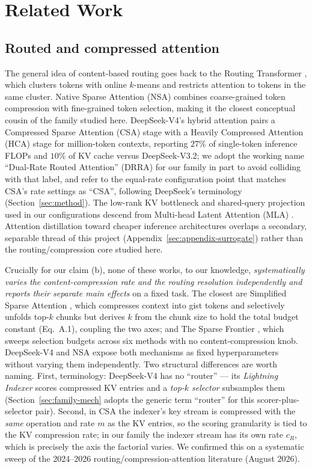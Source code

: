 \section{Related Work}
\label{sec:related}

\subsection{Routed and compressed attention}
The general idea of content-based routing goes back to the Routing
Transformer \citep{roy2020routing}, which clusters tokens with online
$k$-means and restricts attention to tokens in the same cluster. Native
Sparse Attention (NSA) \citep{yuan2025nsa} combines coarse-grained token
compression with fine-grained token selection, making it the closest
conceptual cousin of the family studied here. DeepSeek-V4's hybrid
attention \citep{deepseekv4_2026} pairs a Compressed Sparse Attention (CSA)
stage with a Heavily Compressed Attention (HCA) stage for million-token
contexts, reporting $27\%$ of single-token inference FLOPs and $10\%$ of KV
cache versus DeepSeek-V3.2; we adopt the working name ``Dual-Rate Routed
Attention'' (DRRA) for our family in part to avoid colliding with that
label, and refer to the equal-rate configuration point that matches
CSA's rate settings as ``CSA'', following DeepSeek's terminology
(Section~\ref{sec:method}).
The low-rank KV bottleneck and shared-query projection used in our
configurations descend from Multi-head Latent Attention (MLA)
\citep{deepseekv2_2024}. Attention distillation toward cheaper inference
architectures \citep{goldstein2025radlads} overlaps a secondary, separable
thread of this project (Appendix~\ref{sec:appendix-surrogate}) rather than
the routing/compression core studied here.

Crucially for our claim (b), none of these works, to our knowledge,
\emph{systematically varies the content-compression rate and the routing
resolution independently and reports their separate main effects} on a
fixed task. The closest are Simplified Sparse Attention
\citep{mao2026ssa}, which compresses context into gist tokens and
selectively unfolds top-$k$ chunks but derives $k$ from the chunk size to
hold the total budget constant (Eq.~A.1), coupling the two axes; and The
Sparse Frontier \citep{nawrot2025sparsefrontier}, which sweeps selection
budgets across six methods with no content-compression knob.
DeepSeek-V4 \citep{deepseekv4_2026} and NSA \citep{yuan2025nsa} expose
both mechanisms as fixed hyperparameters without varying them
independently. Two structural differences are worth naming. First,
terminology: DeepSeek-V4 has no ``router'' --- its \emph{Lightning Indexer}
scores compressed KV entries and a \emph{top-$k$ selector} subsamples them
(Section~\ref{sec:family-mech} adopts the generic term ``router'' for this
scorer-plus-selector pair). Second, in CSA the indexer's key stream is
compressed with the \emph{same} operation and rate $m$ as the KV entries,
so the scoring granularity is tied to the KV compression rate; in our
family the indexer stream has its own rate $c_R$, which is precisely the
axis the factorial varies. We confirmed this on a systematic sweep of the 2024--2026
routing/compression-attention literature (August 2026).

